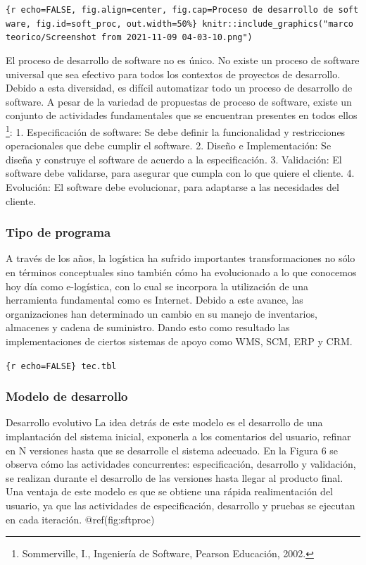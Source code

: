 \documentclass[11pt]{article}
\begin{document}
\texttt{\{r\ echo=FALSE,\ fig.align=\textquotesingle{}center\textquotesingle{},\ fig.cap=\textquotesingle{}Proceso\ de\ desarrollo\ de\ software\textquotesingle{},\ fig.id=\textquotesingle{}soft\_proc\textquotesingle{},\ out.width=\textquotesingle{}50\%\textquotesingle{}\}\ knitr::include\_graphics("marco\ teorico/Screenshot\ from\ 2021-11-09\ 04-03-10.png")}

El proceso de desarrollo de software no es único. No existe un proceso
de software universal que sea efectivo para todos los contextos de
proyectos de desarrollo. Debido a esta diversidad, es difícil
automatizar todo un proceso de desarrollo de software. A pesar de la
variedad de propuestas de proceso de software, existe un conjunto de
actividades fundamentales que se encuentran presentes en todos ellos
\footnote{Sommerville, I., Ingeniería de Software, Pearson Educación,
  2002.}: 1. Especificación de software: Se debe definir la
funcionalidad y restricciones operacionales que debe cumplir el
software. 2. Diseño e Implementación: Se diseña y construye el software
de acuerdo a la especificación. 3. Validación: El software debe
validarse, para asegurar que cumpla con lo que quiere el cliente. 4.
Evolución: El software debe evolucionar, para adaptarse a las
necesidades del cliente.

\hypertarget{tipo-de-programa}{%
\subsubsection{Tipo de programa}\label{tipo-de-programa}}

A través de los años, la logística ha sufrido importantes
transformaciones no sólo en términos conceptuales sino también cómo ha
evolucionado a lo que conocemos hoy día como e-logística, con lo cual se
incorpora la utilización de una herramienta fundamental como es
Internet. Debido a este avance, las organizaciones han determinado un
cambio en su manejo de inventarios, almacenes y cadena de suministro.
Dando esto como resultado las implementaciones de ciertos sistemas de
apoyo como WMS, SCM, ERP y CRM.

\texttt{\{r\ echo=FALSE\}\ tec.tbl}

\hypertarget{modelo-de-desarrollo}{%
\subsubsection{Modelo de desarrollo}\label{modelo-de-desarrollo}}

Desarrollo evolutivo La idea detrás de este modelo es el desarrollo de
una implantación del sistema inicial, exponerla a los comentarios del
usuario, refinar en N versiones hasta que se desarrolle el sistema
adecuado. En la Figura 6 se observa cómo las actividades concurrentes:
especificación, desarrollo y validación, se realizan durante el
desarrollo de las versiones hasta llegar al producto final. Una ventaja
de este modelo es que se obtiene una rápida realimentación del usuario,
ya que las actividades de especificación, desarrollo y pruebas se
ejecutan en cada iteración. @ref(fig:sftproc)
\end{document}
